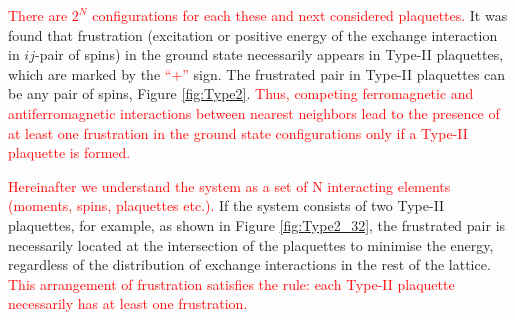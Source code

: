 \documentclass[preprint,12pt]{elsarticle}
\begin{document}
	
	\textcolor{red}{There are $2^N$ configurations for each these and next considered plaquettes.}
	It was found that frustration (excitation or positive energy of the exchange interaction in $ij$-pair of spins) in the ground state necessarily appears in Type-II plaquettes, which are marked by the \textcolor{red}{``$+$''} sign. The frustrated pair in Type-II plaquettes can be any pair of spins, Figure \ref{fig:Type2}. \textcolor{red}{Thus, competing ferromagnetic and antiferromagnetic interactions between nearest neighbors lead to the presence of at least one frustration in the ground state configurations only if a Type-II plaquette is formed.}
	
	\textcolor{red}{Hereinafter we understand the system as a set of N interacting elements (moments, spins, plaquettes etc.).} If the system consists of two Type-II plaquettes, for example, as shown in Figure \ref{fig:Type2_32}, the frustrated pair is necessarily located at the intersection of the plaquettes to minimise the energy, regardless of the distribution of exchange interactions in the rest of the lattice. \textcolor{red}{This arrangement of frustration satisfies the rule: each Type-II plaquette necessarily has at least one frustration.}
	
\end{document}
